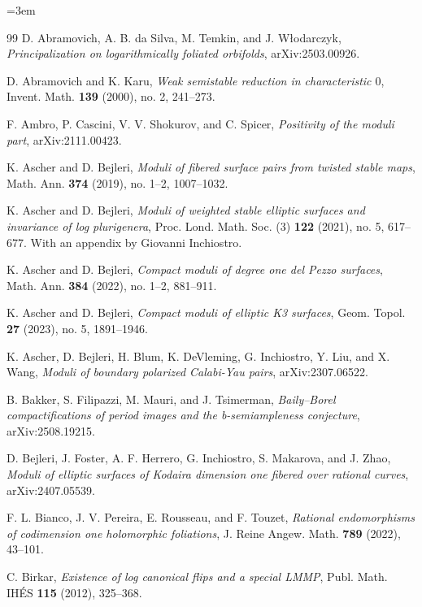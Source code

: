 \documentclass[11pt,reqno]{amsart}
\numberwithin{equation}{section}
\theoremstyle{definition}
\begin{document}
\begingroup
\sloppy
\emergencystretch=3em
\begin{thebibliography}{99}
 D. Abramovich, A. B. da Silva, M. Temkin, and J. W\l{}odarczyk, \textit{Principalization on logarithmically foliated orbifolds}, arXiv:2503.00926.

 D. Abramovich and K. Karu, \textit{Weak semistable reduction in characteristic $0$}, Invent. Math. \textbf{139} (2000), no. 2, 241--273.

 F. Ambro, P. Cascini, V. V. Shokurov, and C. Spicer, \textit{Positivity of the moduli part}, arXiv:2111.00423.

 K. Ascher and D. Bejleri, \textit{Moduli of fibered surface pairs from twisted stable maps}, Math. Ann. \textbf{374} (2019), no. 1--2, 1007--1032.

 K. Ascher and D. Bejleri, \textit{Moduli of weighted stable elliptic surfaces and invariance of log plurigenera}, Proc. Lond. Math. Soc. (3) \textbf{122} (2021), no. 5, 617--677. With an appendix by Giovanni Inchiostro.

 K. Ascher and D. Bejleri, \textit{Compact moduli of degree one del Pezzo surfaces}, Math. Ann. \textbf{384} (2022), no. 1--2, 881--911.

 K. Ascher and D. Bejleri, \textit{Compact moduli of elliptic K3 surfaces}, Geom. Topol. \textbf{27} (2023), no. 5, 1891--1946.

 K. Ascher, D. Bejleri, H. Blum, K. DeVleming, G. Inchiostro, Y. Liu, and X. Wang, \textit{Moduli of boundary polarized Calabi-Yau pairs}, arXiv:2307.06522.

 B. Bakker, S. Filipazzi, M. Mauri, and J. Tsimerman, \textit{Baily--Borel compactifications of period images and the b-semiampleness conjecture}, arXiv:2508.19215.

 D. Bejleri, J. Foster, A. F. Herrero, G. Inchiostro, S. Makarova, and J. Zhao, \textit{Moduli of elliptic surfaces of Kodaira dimension one fibered over rational curves}, arXiv:2407.05539.

 F. L. Bianco, J. V. Pereira, E. Rousseau, and F. Touzet, \textit{Rational endomorphisms of codimension one holomorphic foliations}, J. Reine Angew. Math. \textbf{789} (2022), 43--101.

 C. Birkar, \textit{Existence of log canonical flips and a special LMMP}, Publ. Math. IH\'ES \textbf{115} (2012), 325--368.


\end{thebibliography}
\end{document}
